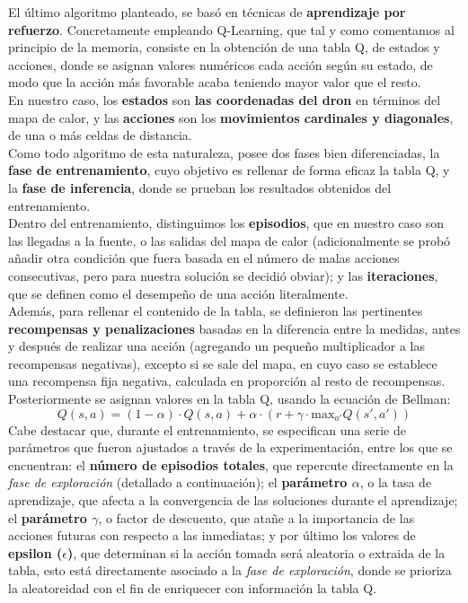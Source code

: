 El último algoritmo planteado, se basó en técnicas de \textbf{aprendizaje por refuerzo}. Concretamente empleando Q-Learning, que tal y como comentamos al principio de la memoria, consiste en la obtención de una tabla Q, de estados y acciones, donde se asignan valores numéricos cada acción según su estado, de modo que la acción más favorable acaba teniendo mayor valor que el resto.\\

En nuestro caso, los \textbf{estados} son \textbf{las coordenadas del dron} en términos del mapa de calor, y las \textbf{acciones} son los \textbf{movimientos cardinales y diagonales}, de una o más celdas de distancia.\\

Como todo algoritmo de esta naturaleza, posee dos fases bien diferenciadas, la \textbf{fase de entrenamiento}, cuyo objetivo es rellenar de forma eficaz la tabla Q, y la \textbf{fase de inferencia}, donde se prueban los resultados obtenidos del entrenamiento.\\

Dentro del entrenamiento, distinguimos los \textbf{episodios}, que en nuestro caso son las llegadas a la fuente, o las salidas del mapa de calor (adicionalmente se probó añadir otra condición que fuera basada en el número de malas acciones consecutivas, pero para nuestra solución se decidió obviar); y las \textbf{iteraciones}, que se definen como el desempeño de una acción literalmente.\\

Además, para rellenar el contenido de la tabla, se definieron las pertinentes \textbf{recompensas y penalizaciones} basadas en la diferencia entre la medidas, antes y después de realizar una acción (agregando un pequeño multiplicador a las recompensas negativas), excepto si se sale del mapa, en cuyo caso se establece una recompensa fija negativa, calculada en proporción al resto de recompensas. Posteriormente se asignan valores en la tabla Q, usando la ecuación de Bellman:
\begin{equation}
    Q(s, a) = (1 - \alpha) \cdot Q(s, a) + \alpha \cdot \left(r + \gamma \cdot \mathrm{max}_{a'} Q(s', a')\right)
\end{equation}
Cabe destacar que, durante el entrenamiento, se especifican una serie de parámetros que fueron ajustados a través de la experimentación, entre los que se encuentran: el \textbf{número de episodios totales}, que repercute directamente en la \emph{fase de exploración} (detallado a continuación); el \textbf{parámetro $\alpha$}, o la tasa de aprendizaje, que afecta a la convergencia de las soluciones durante el aprendizaje; el \textbf{parámetro $\gamma$}, o factor de descuento, que atañe a la importancia de las acciones futuras con respecto a las inmediatas; y por último los valores de \textbf{epsilon ($\epsilon$)}, que determinan si la acción tomada será aleatoria o extraida de la tabla, esto está directamente asociado a la \emph{fase de exploración}, donde se prioriza la aleatoreidad con el fin de enriquecer con información la tabla Q.\\

